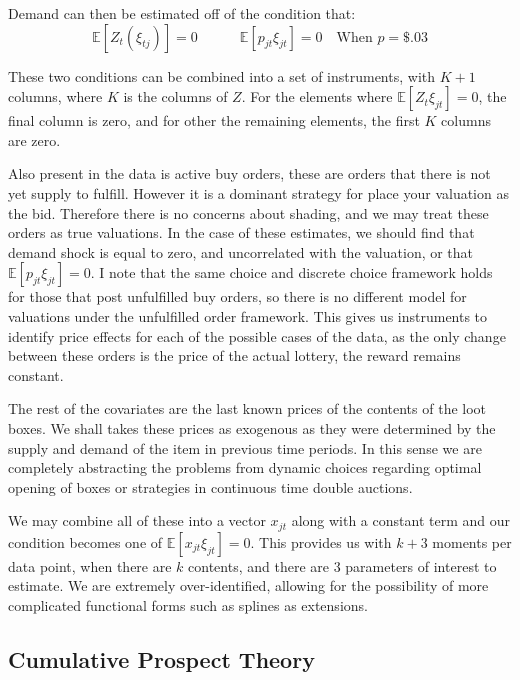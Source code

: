 \documentclass[12pt]{paper}
\newcommand{\exV}[1]{\mathbb{E} \left [ #1 \right ]}
\begin{document}
Demand can then be estimated off of the condition that:
\begin{equation*}
  \exV{Z_t (\xi_{tj})} = 0 \quad \quad \quad \exV{ p_{jt} \xi_{jt} } = 0 \quad \text{When } p = \$.03
\end{equation*}

These two conditions can be combined into a set of instruments, with
$K+1$ columns, where $K$ is the columns of $Z$. For the elements where
$\exV{Z_t \xi_{jt}}= 0$, the final column is zero, and for other the
remaining elements, the first $K$ columns are zero. 

Also present in the data is active buy orders, these are orders
that there is not yet supply to fulfill. However it is a dominant
strategy for place your valuation as the bid. Therefore there is no
concerns about shading, and we may treat these orders as true
valuations. In the case of these estimates, we should find that demand
shock is equal to zero, and uncorrelated with the valuation, or that
$\exV{p_{jt}\xi_{jt}} = 0$. I note that the same choice and discrete
choice framework holds for those that post unfulfilled buy orders, so
there is no different model for valuations under the unfulfilled order
framework. This gives us instruments to identify price effects for each of the
possible cases of the data, as the only change between these orders is
the price of the actual lottery, the reward remains constant.

The rest of the covariates are the last known prices of
the contents of the loot boxes. We shall takes these prices as
exogenous as they were determined by the supply and demand of the item
in previous time periods. In this sense we are completely abstracting
the problems from dynamic choices regarding optimal opening of boxes
or strategies in continuous time double auctions.

We may combine all of these into a vector $x_{jt}$ along with a
constant term and our condition becomes one of
$\exV{x_{jt}\xi_{jt}} = 0$. This provides us with $k + 3$ moments per
data point, when there are $k$ contents, and there are $3$
parameters of interest to estimate. We are extremely over-identified,
allowing for the possibility of more complicated functional forms such
as splines as extensions. 




\subsection{Cumulative Prospect Theory}
\end{document}

